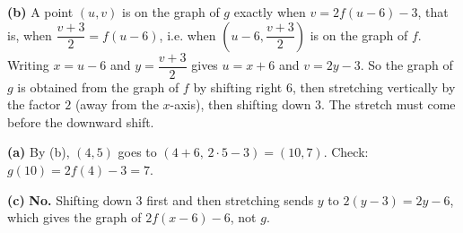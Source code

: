 \textbf{(b)} A point $(u,v)$ is on the graph of $g$ exactly when $v=2f(u-6)-3$, that is, when $\dfrac{v+3}{2}=f(u-6)$, i.e. when $\left(u-6,\dfrac{v+3}{2}\right)$ is on the graph of $f$. Writing $x=u-6$ and $y=\dfrac{v+3}{2}$ gives $u=x+6$ and $v=2y-3$. So the graph of $g$ is obtained from the graph of $f$ by
shifting right $6$, then stretching vertically by the factor $2$ (away from the $x$-axis), then shifting down $3$. The stretch must come before the downward shift.

\textbf{(a)} By (b), $(4,5)$ goes to $(4+6,\,2\cdot5-3)=\boxed{(10,7)}$. Check: $g(10)=2f(4)-3=7$.

\textbf{(c)} \textbf{No.} Shifting down $3$ first and then stretching sends $y$ to $2(y-3)=2y-6$, which gives the graph of $2f(x-6)-6$, not $g$.
